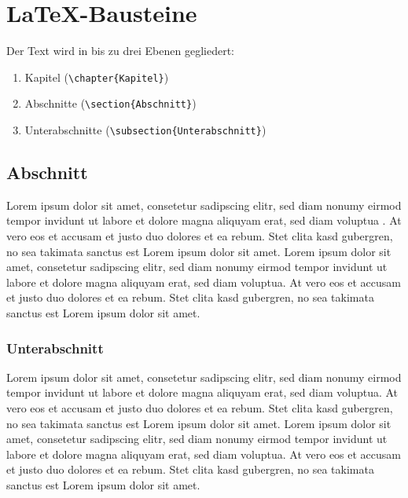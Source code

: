 \label{Bausteine}
\chapter{LaTeX-Bausteine}

Der Text wird in bis zu drei Ebenen gegliedert:

\begin{enumerate}
	\item Kapitel (\verb|\chapter{Kapitel}|)
	\item Abschnitte (\verb|\section{Abschnitt}|)
	\item Unterabschnitte (\verb|\subsection{Unterabschnitt}|)
\end{enumerate}

\section{Abschnitt}

Lorem ipsum dolor sit amet, consetetur sadipscing elitr, sed diam nonumy eirmod tempor invidunt ut labore et dolore magna aliquyam erat, sed diam voluptua \cite{Nannen:03}. At vero eos et accusam et justo duo dolores et ea rebum. Stet clita kasd gubergren, no sea takimata sanctus est Lorem ipsum dolor sit amet. Lorem ipsum dolor sit amet, consetetur sadipscing elitr, sed diam nonumy eirmod tempor invidunt ut labore et dolore magna aliquyam erat, sed diam voluptua. At vero eos et accusam et justo duo dolores et ea rebum. Stet clita kasd gubergren, no sea takimata sanctus est Lorem ipsum dolor sit amet.

\subsection{Unterabschnitt} 

Lorem ipsum dolor sit amet, consetetur sadipscing elitr, sed diam nonumy eirmod tempor invidunt ut labore et dolore magna aliquyam erat, sed diam voluptua. At vero eos et accusam et justo duo dolores et ea rebum. Stet clita kasd gubergren, no sea takimata sanctus est Lorem ipsum dolor sit amet. Lorem ipsum dolor sit amet, consetetur sadipscing elitr, sed diam nonumy eirmod tempor invidunt ut labore et dolore magna aliquyam erat, sed diam voluptua. At vero eos et accusam et justo duo dolores et ea rebum. Stet clita kasd gubergren, no sea takimata sanctus est Lorem ipsum dolor sit amet.

